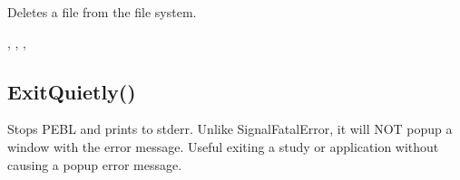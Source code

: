 \documentclass[letterpaper,10pt,english]{sphinxmanual}
\begin{document}
\sphinxAtStartPar
Deletes a file from the file system.

\sphinxAtStartPar
{}

\begin{sphinxVerbatim}[commandchars=\\\{\}]
\end{sphinxVerbatim}

\sphinxAtStartPar
{}

\begin{sphinxVerbatim}[commandchars=\\\{\}]
\end{sphinxVerbatim}

\sphinxAtStartPar
{}

\sphinxAtStartPar
{}, ,       ,            

\ignorespaces 

\subsection{ExitQuietly()}
\label{\detokenize{reference/peblenvironment:exitquietly}}\label{\detokenize{reference/peblenvironment:index-5}}
\sphinxAtStartPar
{}

\sphinxAtStartPar
Stops PEBL and prints  to stderr. Unlike SignalFatalError, it will NOT pop\sphinxhyphen{}up a window with the error message. Useful exiting a study or application without causing a popup error message.

\sphinxAtStartPar
{}
\end{document}
